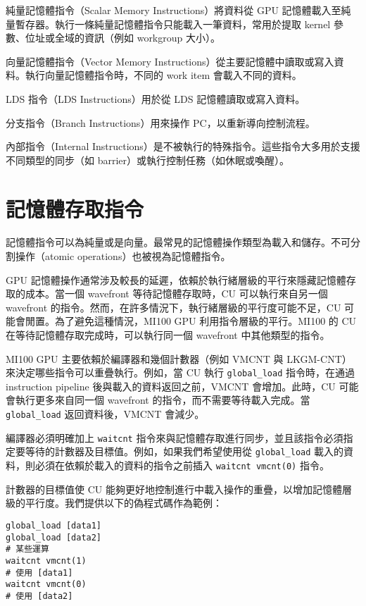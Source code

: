 純量記憶體指令（Scalar Memory Instructions）將資料從 GPU 記憶體載入至純量暫存器。執行一條純量記憶體指令只能載入一筆資料，常用於提取 kernel 參數、位址或全域的資訊（例如 workgroup 大小）。

向量記憶體指令（Vector Memory Instructions）從主要記憶體中讀取或寫入資料。執行向量記憶體指令時，不同的 work item 會載入不同的資料。

LDS 指令（LDS Instructions）用於從 LDS 記憶體讀取或寫入資料。

分支指令（Branch Instructions）用來操作 PC，以重新導向控制流程。

內部指令（Internal Instructions）是不被執行的特殊指令。這些指令大多用於支援不同類型的同步（如 barrier）或執行控制任務（如休眠或喚醒）。


\section{記憶體存取指令}
\label{sec:memory_access_instructions}

記憶體指令可以為純量或是向量。最常見的記憶體操作類型為載入和儲存。不可分割操作（atomic operations）也被視為記憶體指令。

GPU 記憶體操作通常涉及較長的延遲，依賴於執行緒層級的平行來隱藏記憶體存取的成本。當一個 wavefront 等待記憶體存取時，CU 可以執行來自另一個 wavefront 的指令。然而，在許多情況下，執行緒層級的平行度可能不足，CU 可能會閒置。為了避免這種情況，MI100 GPU 利用指令層級的平行。MI100 的 CU 在等待記憶體存取完成時，可以執行同一個 wavefront 中其他類型的指令。

MI100 GPU 主要依賴於編譯器和幾個計數器（例如 VMCNT 與 LKGM-CNT）來決定哪些指令可以重疊執行。例如，當 CU 執行 \lstinline|global_load| 指令時，在通過 instruction pipeline 後與載入的資料返回之前，VMCNT 會增加。此時，CU 可能會執行更多來自同一個 wavefront 的指令，而不需要等待載入完成。當 \lstinline|global_load| 返回資料後，VMCNT 會減少。

編譯器必須明確加上 \lstinline|waitcnt| 指令來與記憶體存取進行同步，並且該指令必須指定要等待的計數器及目標值。例如，如果我們希望使用從 \lstinline|global_load| 載入的資料，則必須在依賴於載入的資料的指令之前插入 \lstinline|waitcnt vmcnt(0)| 指令。

計數器的目標值使 CU 能夠更好地控制進行中載入操作的重疊，以增加記憶體層級的平行度。我們提供以下的偽程式碼作為範例：

\begin{lstlisting}[caption={記憶體載入的偽程式碼}]
global_load [data1]
global_load [data2]
# 某些運算
waitcnt vmcnt(1)
# 使用 [data1]
waitcnt vmcnt(0)
# 使用 [data2]
\end{lstlisting}

